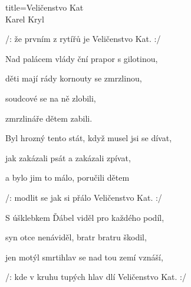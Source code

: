 \begin{song}{title=\centering Veličenstvo Kat \\\normalsize Karel Kryl  \vspace*{-0.3cm}}
{\begin{minipage}[t]{0.55\textwidth}
   	/: že prvním z rytířů je Veličenstvo Kat. :/
   	
	Nad palácem vlády ční prapor s gilotinou,
 
 	děti mají rády kornouty se zmrzlinou,
  
  	soudcové se na ně zlobili,
   
   	zmrzlináře dětem zabili.


\end{minipage}\begin{minipage}[t]{0.55\textwidth}\setlength{\parindent}{0.45cm}\vspace*{0.55cm}  %

\sloka
	Byl hrozný tento stát, když musel jsi se dívat,
   
   	jak zakázali psát a zakázali zpívat,
   
   	a bylo jim to málo, poručili dětem
   
   	/: modlit se jak si přálo Veličenstvo Kat. :/

\sloka
	S úšklebkem Ďábel viděl pro každého podíl,
  
  	syn otce nenáviděl, bratr bratru škodil,
   
   	jen motýl smrtihlav se nad tou zemí vznáší,
   
   	/: kde v kruhu tupých hlav dlí Veličenstvo Kat. :/


\end{minipage}
}
\setcounter{Slokočet}{0}
\end{song}

